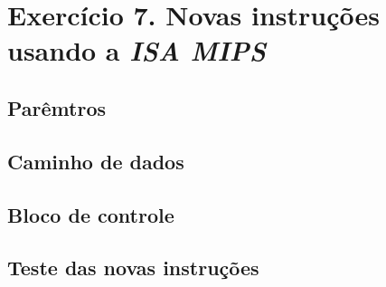 \documentclass[12pt]{article}
\begin{document}
  
\section{Exercício 7. Novas instruções usando a \textit{ISA MIPS}}
\label{sec:isamips} 

\subsection{Parêmtros}
\label{subsec:param}


\subsection{Caminho de dados}
\label{subsec:datapath}


\subsection{Bloco de controle}
\label{subsec:control}


\subsection{Teste das novas instruções}
\label{subsec:testeisa}




\end{document}
